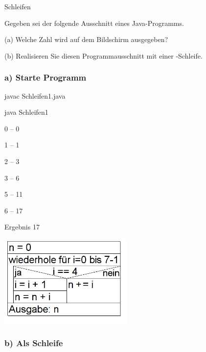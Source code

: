 \begin{frame}[t]%

\begin{exercise}{Schleifen}
\begin{body}
Gegeben sei der folgende Ausschnitt eines Java-Programms.

\begin{parts}
\item[(a)] Welche Zahl wird auf dem Bildschirm ausgegeben?
\item[(b)] Realisieren Sie diesen Programmausschnitt mit einer -Schleife.
\end{parts}
\end{body}
\end{exercise}
\end{frame}


\begin{frame}[fragile]%
 \frametitle{a) Starte Programm}%

\begin{description}[style=BASH]
\item[Konsole]
\item javac Schleifen1.java
\item java Schleifen1
\item 0  --  0
\item 1  --  1
\item 2  --  3
\item 3  --  6
\item 5  --  11
\item 6  --  17
\item Ergebnis 17
\end{description}

\begin{center}
\includegraphics[width=0.5\textwidth]{schleifen-1/Bilder/Struktogramm}
\end{center}
\end{frame}


\begin{frame}[fragile]%
 \frametitle{b) Als  Schleife}%


\end{frame}
